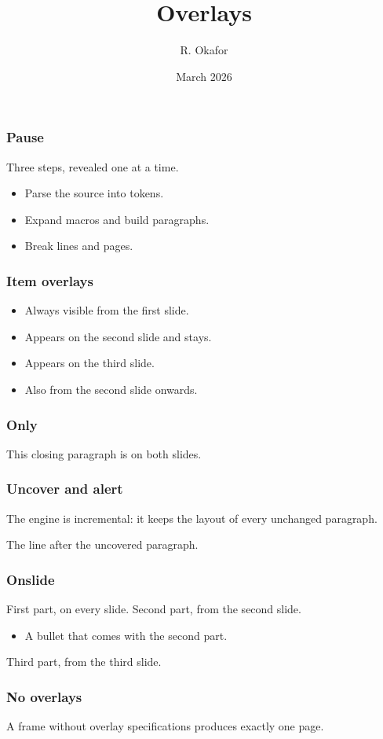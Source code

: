 \documentclass{beamer}
\title{Overlays}
\author{R. Okafor}
\date{March 2026}
\begin{document}
\begin{frame}
  \frametitle{Pause}
  Three steps, revealed one at a time.
  \begin{itemize}
    \item Parse the source into tokens.
    \pause
    \item Expand macros and build paragraphs.
    \pause
    \item Break lines and pages.
  \end{itemize}
\end{frame}

\begin{frame}
  \frametitle{Item overlays}
  \begin{itemize}
    \item<1-> Always visible from the first slide.
    \item<2-> Appears on the second slide and stays.
    \item<3-> Appears on the third slide.
    \item<2-> Also from the second slide onwards.
  \end{itemize}
\end{frame}

\begin{frame}
  \frametitle{Only}

  This closing paragraph is on both slides.
\end{frame}

\begin{frame}
  \frametitle{Uncover and alert}
  The engine is \alert<2>{incremental}: it keeps the layout of every
  unchanged paragraph.


  The line after the uncovered paragraph.
\end{frame}

\begin{frame}
  \frametitle{Onslide}
  First part, on every slide.
  Second part, from the second slide.
  \begin{itemize}
    \item A bullet that comes with the second part.
  \end{itemize}
  Third part, from the third slide.
\end{frame}

\begin{frame}
  \frametitle{No overlays}
  A frame without overlay specifications produces exactly one page.
\end{frame}
\end{document}
